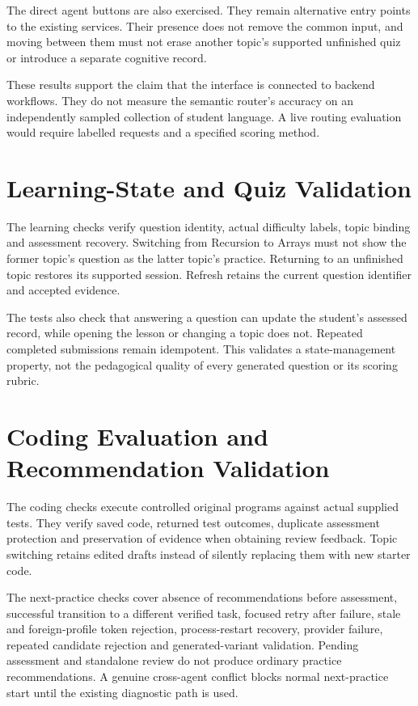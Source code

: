 The direct agent buttons are also exercised. They remain alternative entry points to the existing services. Their presence does not remove the common input, and moving between them must not erase another topic's supported unfinished quiz or introduce a separate cognitive record.

These results support the claim that the interface is connected to backend workflows. They do not measure the semantic router's accuracy on an independently sampled collection of student language. A live routing evaluation would require labelled requests and a specified scoring method.

\section{Learning-State and Quiz Validation}
The learning checks verify question identity, actual difficulty labels, topic binding and assessment recovery. Switching from Recursion to Arrays must not show the former topic's question as the latter topic's practice. Returning to an unfinished topic restores its supported session. Refresh retains the current question identifier and accepted evidence.

The tests also check that answering a question can update the student's assessed record, while opening the lesson or changing a topic does not. Repeated completed submissions remain idempotent. This validates a state-management property, not the pedagogical quality of every generated question or its scoring rubric.

\section{Coding Evaluation and Recommendation Validation}
The coding checks execute controlled original programs against actual supplied tests. They verify saved code, returned test outcomes, duplicate assessment protection and preservation of evidence when obtaining review feedback. Topic switching retains edited drafts instead of silently replacing them with new starter code.

The next-practice checks cover absence of recommendations before assessment, successful transition to a different verified task, focused retry after failure, stale and foreign-profile token rejection, process-restart recovery, provider failure, repeated candidate rejection and generated-variant validation. Pending assessment and standalone review do not produce ordinary practice recommendations. A genuine cross-agent conflict blocks normal next-practice start until the existing diagnostic path is used.

